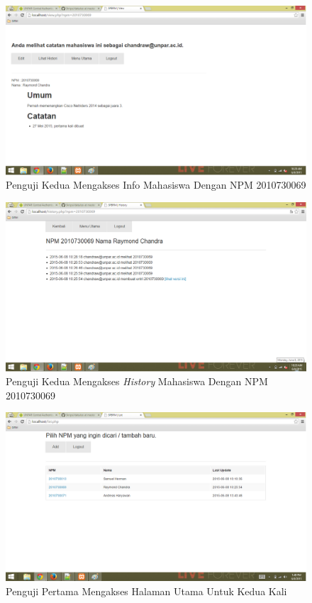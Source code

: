 \begin{figure}[p]
\centering
\includegraphics[scale=0.44]{Gambar/eks6.png}
\caption[Penguji Kedua Mengakses Info Mahasiswa Dengan NPM 2010730069]{Penguji Kedua Mengakses Info Mahasiswa Dengan NPM 2010730069} 
\label{fig:eks6}
\end{figure}

\begin{figure}[p]
\centering
\includegraphics[scale=0.44]{Gambar/eks7.png}
\caption[Penguji Kedua Mengakses {\it History} Mahasiswa Dengan NPM 2010730069]{Penguji Kedua Mengakses {\it History} Mahasiswa Dengan NPM 2010730069} 
\label{fig:eks7}
\end{figure}

\begin{figure}[p]
\centering
\includegraphics[scale=0.44]{Gambar/eks8.png}
\caption[Penguji Pertama Mengakses Halaman Utama Untuk Kedua Kali]{Penguji Pertama Mengakses Halaman Utama Untuk Kedua Kali} 
\label{fig:eks8}
\end{figure}

